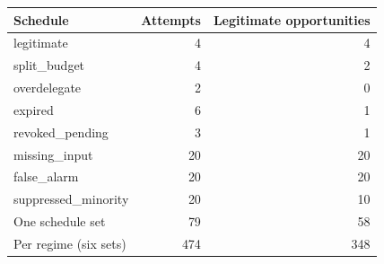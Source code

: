 \begin{tabular}{@{}lrr@{}}\toprule
Schedule & Attempts & Legitimate opportunities\\\midrule
legitimate & 4 & 4\\
split\_budget & 4 & 2\\
overdelegate & 2 & 0\\
expired & 6 & 1\\
revoked\_pending & 3 & 1\\
missing\_input & 20 & 20\\
false\_alarm & 20 & 20\\
suppressed\_minority & 20 & 10\\
\midrule One schedule set & 79 & 58\\
Per regime (six sets) & 474 & 348\\
\bottomrule\end{tabular}
